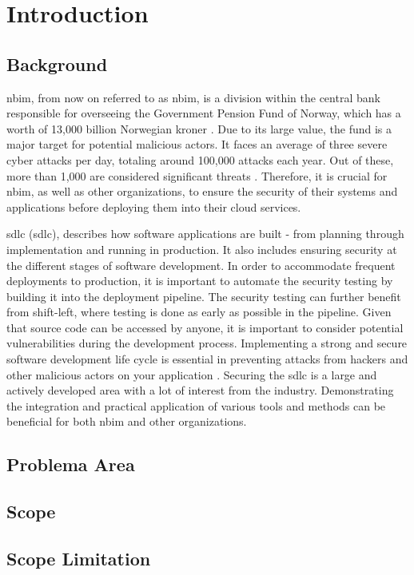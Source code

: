 
\section{Introduction}

\subsection{Background}
\acrlong{nbim}, from now on referred to as \acrshort{nbim}, is a division within the central bank responsible for overseeing the Government Pension Fund of Norway, which has a worth of 13,000 billion Norwegian kroner \cite{nbimwebsite}. Due to its large value, the fund is a major target for potential malicious actors. It faces an average of three severe cyber attacks per day, totaling around 100,000 attacks each year. Out of these, more than 1,000 are considered significant threats \cite{nbimattacks}. Therefore, it is crucial for \acrshort{nbim}, as well as other organizations, to ensure the security of their systems and applications before deploying them into their cloud services. 

\acrlong{sdlc} (\acrshort{sdlc}), describes how software applications are built - from planning through implementation and running in production. It also includes ensuring security at the different stages of software development. In order to accommodate frequent deployments to production, it is important to automate the security testing by building it into the deployment pipeline. The security testing can further benefit from shift-left, where testing is done as early as possible in the pipeline. Given that source code can be accessed by anyone, it is important to consider potential vulnerabilities during the development process. Implementing a strong and secure software development life cycle is essential in preventing attacks from hackers and other malicious actors on your application 
\cite{sdlc}. Securing the \acrshort{sdlc} is a large and actively developed area with a lot of interest from the industry. Demonstrating the integration and practical application of various tools and methods can be beneficial for both \acrshort{nbim} and other organizations.
\subsection{Problema Area}
\subsection{Scope}
\subsection{Scope Limitation}
